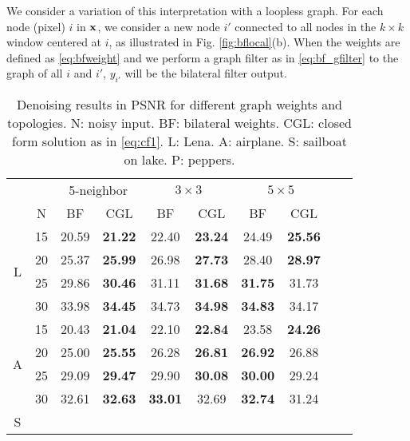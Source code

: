 \documentclass{article}
\begin{document}
We consider a variation of this interpretation with a loopless graph. For each node (pixel) $i$ in ${\bf x}$, we consider a new node $i'$ connected to all nodes in the $k\times k$ window centered at $i$, as illustrated in Fig. \ref{fig:bflocal}(b). When the weights are defined as \eqref{eq:bfweight} and we perform a graph filter as in \eqref{eq:bf_gfilter} to the graph of all $i$ and $i'$, $y_{i'}$ will be the bilateral filter output.

% 
% 
\begin{table}
\caption{Denoising results in PSNR for different graph weights and topologies. N: noisy input. BF: bilateral weights. CGL: closed form solution as in \eqref{eq:cf1}. L: Lena. A: airplane. S: sailboat on lake. P: peppers.}
\label{tab:denoise}
\centering
\begin{tabular}{|c||c||c|c||c|c||c|c||c|c||}
\hline
&& \multicolumn{2}{|c||}{5-neighbor} & \multicolumn{2}{|c||}{$3\times 3$} & \multicolumn{2}{|c||}{$5\times 5$}\\
\cline{2-8} & N & BF & CGL & BF & CGL & BF & CGL \\
\hline
\multirow{4}{*}{L} 
& 15 & 20.59 & {\bf 21.22} & 22.40 & {\bf 23.24} & 24.49 & {\bf 25.56} \\
& 20 & 25.37 & {\bf 25.99} & 26.98 & {\bf 27.73} & 28.40 & {\bf 28.97} \\
& 25 & 29.86 & {\bf 30.46} & 31.11 & {\bf 31.68} & {\bf 31.75} & 31.73 \\
& 30 & 33.98 & {\bf 34.45} & 34.73 & {\bf 34.98} & {\bf 34.83} & 34.17 \\
\hline
\multirow{4}{*}{A} 
& 15 & 20.43 & {\bf 21.04} & 22.10 & {\bf 22.84} & 23.58 & {\bf 24.26} \\
& 20 & 25.00 & {\bf 25.55} & 26.28 & {\bf 26.81} & {\bf 26.92} & 26.88 \\
& 25 & 29.09 & {\bf 29.47} & 29.90 & {\bf 30.08} & {\bf 30.00} & 29.24 \\
& 30 & 32.61 & {\bf 32.63} & {\bf 33.01} & 32.69 & {\bf 32.74} & 31.24 \\
\hline
\multirow{4}{*}{S} 

\end{tabular}
\end{table}
\end{document}
